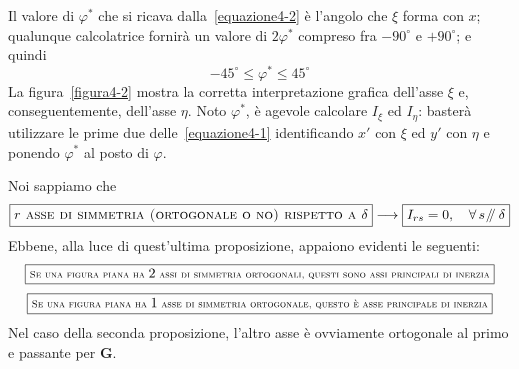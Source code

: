 Il valore di $\varphi^*$ che si ricava dalla~\eqref{equazione4-2} è l'angolo che $\xi$ forma con $x$; qualunque calcolatrice fornirà un valore di $2\varphi^*$ compreso fra $-90^{\circ}$ e $+90^{\circ}$; e quindi
\begin{equation*}
\boxed{-45^{\circ}\le \varphi^{*} \le 45^{\circ}}
\end{equation*}
La figura~\ref{figura4-2} mostra la corretta interpretazione grafica dell'asse $\xi$  e, conseguentemente, dell'asse $\eta$. Noto $\varphi^{*}$, è agevole calcolare $I_{\xi}$ ed $I_{\eta}$: basterà utilizzare le prime due delle~\eqref{equazione4-1} identificando $x'$ con $\xi$ ed $y'$ con $\eta$ e ponendo $\varphi^{*}$ al posto di $\varphi$. 

\noindent Noi sappiamo che
\begin{equation*}
\boxed{r\textup{\textsc{ asse di simmetria (ortogonale o no) rispetto a }}\delta} \longrightarrow \boxed{I_{rs} = 0, \quad \forall\,s\mathbin{\!/\mkern-5mu/\!}\,\delta}
\end{equation*}
Ebbene, alla luce di quest'ultima proposizione, appaiono evidenti le seguenti:
\begin{equation*}
\boxed{\textup{\scriptsize \textsc{Se una figura piana ha }}2\textup{\scriptsize \textsc{ assi di simmetria ortogonali, questi sono assi principali di inerzia}}}
\end{equation*}
\begin{equation*}
\boxed{\textup{\scriptsize \textsc{Se una figura piana ha }}1\textup{\scriptsize \textsc{ asse di simmetria ortogonale, questo è asse principale di inerzia}}}
\end{equation*}
Nel caso della seconda proposizione, l'altro asse è ovviamente ortogonale al primo e passante per $\mathbf{G}$.
\clearpage
